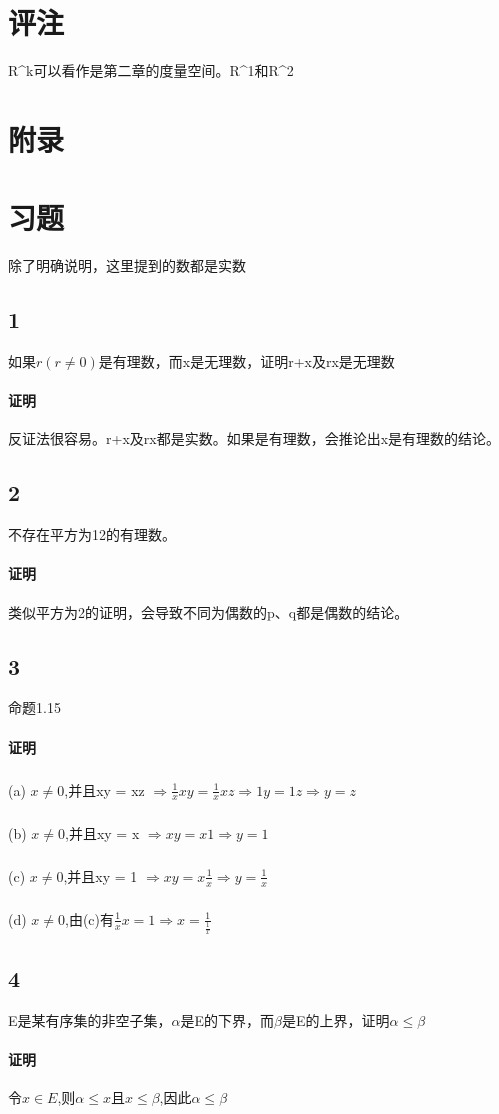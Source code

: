 \section{评注} R^k可以看作是第二章的度量空间。R^1和R^2
\section*{附录}
\section*{习题}除了明确说明，这里提到的数都是实数
\subsection*{1}如果$ r(r \ne 0) $是有理数，而x是无理数，证明r+x及rx是无理数
\paragraph{证明}反证法很容易。r+x及rx都是实数。如果是有理数，会推论出x是有理数的结论。
\subsection*{2} 不存在平方为12的有理数。
\paragraph{证明}类似平方为2的证明，会导致不同为偶数的p、q都是偶数的结论。
\subsection*{3} 命题1.15
\paragraph{证明}
\subparagraph{} (a) $x\ne 0$,并且xy = xz $ \Rightarrow \frac{1}{x}xy=\frac{1}{x}xz \Rightarrow 1y=1z \Rightarrow y=z$
\subparagraph{} (b) $x\ne 0$,并且xy = x $ \Rightarrow xy = x1 \Rightarrow y = 1 $
\subparagraph{} (c) $x\ne 0$,并且xy = 1 $ \Rightarrow xy = x\frac{1}{x} \Rightarrow y = \frac{1}{x} $
\subparagraph{} (d) $x\ne 0$,由(c)有$\frac{1}{x}x=1 \Rightarrow x=\frac{1}{\frac{1}{x}}$
\subsection*{4} E是某有序集的非空子集，$\alpha$是E的下界，而$\beta$是E的上界，证明$\alpha \le \beta$
\paragraph{证明}令$x \in E$,则$ \alpha \le x $且$x \le \beta$,因此$\alpha \le \beta$
